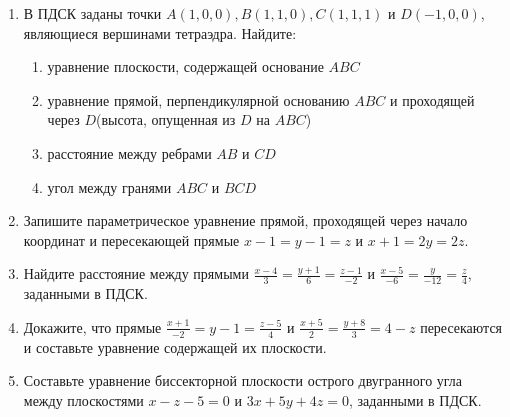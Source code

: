 \begin{enumerate}
    \item В ПДСК заданы точки $A(1, 0, 0), B(1, 1, 0), C(1, 1, 1)$ и $D(-1, 0, 0)$, являющиеся вершинами тетраэдра. Найдите:
         \begin{enumerate}
	        \item уравнение плоскости, содержащей основание $ABC$
	        \item уравнение прямой, перпендикулярной основанию $ABC$ и проходящей через $D$(высота, опущенная из $D$ на $ABC$)
	        \item расстояние между ребрами $AB$ и $CD$
	        \item угол между гранями $ABC$ и $BCD$ 
	    \end{enumerate}

    \item Запишите параметрическое уравнение прямой, проходящей через начало координат и пересекающей прямые $x-1 = y-1 = z$ и $x+1 = 2y = 2z$.
    
    \item Найдите расстояние между прямыми $\frac{x-4}{3}=\frac{y+1}{6}=\frac{z-1}{-2}$ и $\frac{x-5}{-6}=\frac{y}{-12}=\frac{z}{4}$, заданными в ПДСК.
    
    \item Докажите, что прямые $\frac{x+1}{-2}=y-1 = \frac{z-5}{4}$ и $\frac{x+5}{2}=\frac{y+8}{3}= 4-z$ пересекаются и составьте уравнение содержащей их плоскости.
    
    \item Составьте уравнение биссекторной плоскости острого двугранного угла между плоскостями $x - z - 5 = 0$ и $3x + 5y + 4z = 0$, заданными в ПДСК.
\end{enumerate}